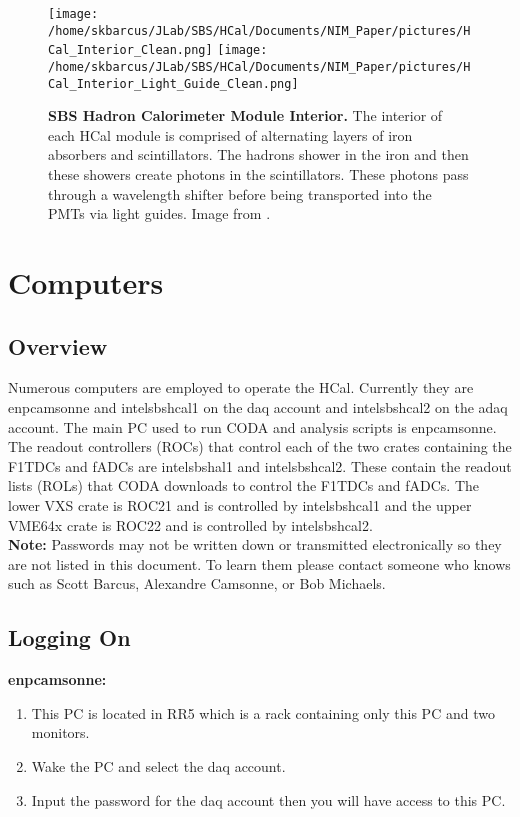 \documentclass[oneside]{book}   %
\begin{document}
	\begin{figure}[!ht]
	\begin{center}
	\texttt{[image: /home/skbarcus/JLab/SBS/HCal/Documents/NIM\_Paper/pictures/HCal\_Interior\_Clean.png]}
	\texttt{[image: /home/skbarcus/JLab/SBS/HCal/Documents/NIM\_Paper/pictures/HCal\_Interior\_Light\_Guide\_Clean.png]}
	\end{center}
	\caption{
	{\bf{SBS Hadron Calorimeter Module Interior.}} The interior of each HCal module is comprised of alternating layers of iron absorbers and scintillators. The hadrons shower in the iron and then these showers create photons in the scintillators. These photons pass through a wavelength shifter before being transported into the PMTs via light guides. Image from \cite{brio_2018}.}
	\label{fig:HCal_interior}
	\end{figure}	


\chapter{Computers}
\label{ch:computers}
\section{Overview}
\label{sec:computers_overview}

Numerous computers are employed to operate the HCal. Currently they are enpcamsonne and intelsbshcal1 on the daq account and intelsbshcal2 on the adaq account. The main PC used to run CODA and analysis scripts is enpcamsonne. The readout controllers (ROCs) that control each of the two crates containing the F1TDCs and fADCs are intelsbshal1 and intelsbshcal2. These contain the readout lists (ROLs) that CODA downloads to control the F1TDCs and fADCs. The lower VXS crate is ROC21 and is controlled by intelsbshcal1 and the upper VME64x crate is ROC22 and is controlled by intelsbshcal2.\\

\textbf{\large{Note:}} 
Passwords may not be written down or transmitted electronically so they are not listed in this document. To learn them please contact someone who knows such as Scott Barcus, Alexandre Camsonne, or Bob Michaels.

\section{Logging On}
\label{sec:logging_on}

\textbf{\large{enpcamsonne:}}
\begin{enumerate}
	\item This PC is located in RR5 which is a rack containing only this PC and two monitors.
	\item Wake the PC and select the daq account.
	\item Input the password for the daq account then you will have access to this PC.
\end{enumerate}
\end{document}
